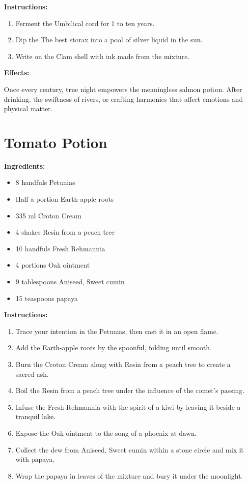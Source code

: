 \documentclass{article}
\begin{document}
\textbf{Instructions:}

\begin{enumerate}
  \item Ferment the Umbilical cord for 1 to ten years.
  \item Dip the The best storax into a pool of silver liquid in the sun.
  \item Write on the Clam shell with ink made from the mixture.
\end{enumerate}

\textbf{Effects:}

Once every century, true night empowers the meaningless salmon potion. After drinking, the swiftness of rivers, or crafting harmonies that affect emotions and physical matter.

\newpage
\section*{Tomato Potion}

\textbf{Ingredients:}

\begin{itemize}
  \item 8 handfuls Petunias
  \item Half a portion Earth-apple roots
  \item 335 ml Croton Cream
  \item 4 shakes Resin from a peach tree
  \item 10 handfuls Fresh Rehmannia
  \item 4 portions Oak ointment
  \item 9 tablespoons Aniseed, Sweet cumin
  \item 15 teaspoons papaya
\end{itemize}

\textbf{Instructions:}

\begin{enumerate}
  \item Trace your intention in the Petunias, then cast it in an open flame.
  \item Add the Earth-apple roots by the spoonful, folding until smooth.
  \item Burn the Croton Cream along with Resin from a peach tree to create a sacred ash.
  \item Boil the Resin from a peach tree under the influence of the comet’s passing.
  \item Infuse the Fresh Rehmannia with the spirit of a kiwi by leaving it beside a tranquil lake.
  \item Expose the Oak ointment to the song of a phoenix at dawn.
  \item Collect the dew from Aniseed, Sweet cumin within a stone circle and mix it with papaya.
  \item Wrap the papaya in leaves of the mixture and bury it under the moonlight.
\end{enumerate}
\end{document}

